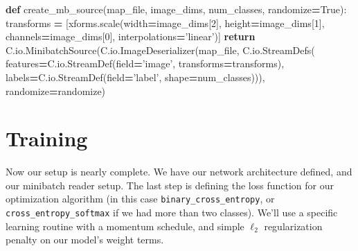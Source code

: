 \documentclass[]{book}
\newenvironment{Shaded}{\begin{snugshade}}{\end{snugshade}}
\newcommand{\KeywordTok}[1]{\textcolor[rgb]{0.13,0.29,0.53}{\textbf{#1}}}
\newcommand{\DecValTok}[1]{\textcolor[rgb]{0.00,0.00,0.81}{#1}}
\newcommand{\StringTok}[1]{\textcolor[rgb]{0.31,0.60,0.02}{#1}}
\newcommand{\VariableTok}[1]{\textcolor[rgb]{0.00,0.00,0.00}{#1}}
\newcommand{\ControlFlowTok}[1]{\textcolor[rgb]{0.13,0.29,0.53}{\textbf{#1}}}
\newcommand{\OperatorTok}[1]{\textcolor[rgb]{0.81,0.36,0.00}{\textbf{#1}}}
\newcommand{\NormalTok}[1]{#1}
\theoremstyle{definition}
\theoremstyle{definition}
\theoremstyle{definition}
\theoremstyle{remark}
\begin{document}
\begin{Shaded}
\begin{Highlighting}[]
\KeywordTok{def}\NormalTok{ create_mb_source(map_file, image_dims, num_classes, randomize}\OperatorTok{=}\VariableTok{True}\NormalTok{):}
\NormalTok{    transforms }\OperatorTok{=}\NormalTok{ [xforms.scale(width}\OperatorTok{=}\NormalTok{image_dims[}\DecValTok{2}\NormalTok{], height}\OperatorTok{=}\NormalTok{image_dims[}\DecValTok{1}\NormalTok{], }
\NormalTok{                               channels}\OperatorTok{=}\NormalTok{image_dims[}\DecValTok{0}\NormalTok{], interpolations}\OperatorTok{=}\StringTok{'linear'}\NormalTok{)]}
    \ControlFlowTok{return}\NormalTok{ C.io.MinibatchSource(C.io.ImageDeserializer(map_file, C.io.StreamDefs(}
\NormalTok{            features}\OperatorTok{=}\NormalTok{C.io.StreamDef(field}\OperatorTok{=}\StringTok{'image'}\NormalTok{, transforms}\OperatorTok{=}\NormalTok{transforms),}
\NormalTok{            labels}\OperatorTok{=}\NormalTok{C.io.StreamDef(field}\OperatorTok{=}\StringTok{'label'}\NormalTok{, shape}\OperatorTok{=}\NormalTok{num_classes))),}
\NormalTok{            randomize}\OperatorTok{=}\NormalTok{randomize)}
\end{Highlighting}
\end{Shaded}

\section{Training}\label{training}

Now our setup is nearly complete. We have our network architecture
defined, and our minibatch reader setup. The last step is defining the
loss function for our optimization algorithm (in this case
\texttt{binary\_cross\_entropy}, or \texttt{cross\_entropy\_softmax} if
we had more than two classes). We'll use a specific learning routine
with a momentum schedule, and simple \(\ell_2\) regularization penalty
on our model's weight terms.
\end{document}
